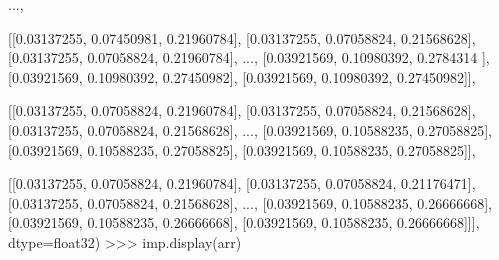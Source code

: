 \documentclass[]{article}
\newenvironment{Shaded}{\begin{snugshade}}{\end{snugshade}}
\newcommand{\FloatTok}[1]{\textcolor[rgb]{0.96,0.45,0.00}{#1}}
\newcommand{\NormalTok}[1]{\textcolor[rgb]{0.81,0.81,0.76}{#1}}
\newcommand{\OperatorTok}[1]{\textcolor[rgb]{0.81,0.81,0.76}{#1}}
\begin{document}
\begin{Shaded}
\begin{Highlighting}[]
\NormalTok{       ...,}

\NormalTok{       [[}\FloatTok{0.03137255}\NormalTok{, }\FloatTok{0.07450981}\NormalTok{, }\FloatTok{0.21960784}\NormalTok{],}
\NormalTok{        [}\FloatTok{0.03137255}\NormalTok{, }\FloatTok{0.07058824}\NormalTok{, }\FloatTok{0.21568628}\NormalTok{],}
\NormalTok{        [}\FloatTok{0.03137255}\NormalTok{, }\FloatTok{0.07058824}\NormalTok{, }\FloatTok{0.21960784}\NormalTok{],}
\NormalTok{        ...,}
\NormalTok{        [}\FloatTok{0.03921569}\NormalTok{, }\FloatTok{0.10980392}\NormalTok{, }\FloatTok{0.2784314}\NormalTok{ ],}
\NormalTok{        [}\FloatTok{0.03921569}\NormalTok{, }\FloatTok{0.10980392}\NormalTok{, }\FloatTok{0.27450982}\NormalTok{],}
\NormalTok{        [}\FloatTok{0.03921569}\NormalTok{, }\FloatTok{0.10980392}\NormalTok{, }\FloatTok{0.27450982}\NormalTok{]],}

\NormalTok{       [[}\FloatTok{0.03137255}\NormalTok{, }\FloatTok{0.07058824}\NormalTok{, }\FloatTok{0.21960784}\NormalTok{],}
\NormalTok{        [}\FloatTok{0.03137255}\NormalTok{, }\FloatTok{0.07058824}\NormalTok{, }\FloatTok{0.21568628}\NormalTok{],}
\NormalTok{        [}\FloatTok{0.03137255}\NormalTok{, }\FloatTok{0.07058824}\NormalTok{, }\FloatTok{0.21568628}\NormalTok{],}
\NormalTok{        ...,}
\NormalTok{        [}\FloatTok{0.03921569}\NormalTok{, }\FloatTok{0.10588235}\NormalTok{, }\FloatTok{0.27058825}\NormalTok{],}
\NormalTok{        [}\FloatTok{0.03921569}\NormalTok{, }\FloatTok{0.10588235}\NormalTok{, }\FloatTok{0.27058825}\NormalTok{],}
\NormalTok{        [}\FloatTok{0.03921569}\NormalTok{, }\FloatTok{0.10588235}\NormalTok{, }\FloatTok{0.27058825}\NormalTok{]],}

\NormalTok{       [[}\FloatTok{0.03137255}\NormalTok{, }\FloatTok{0.07058824}\NormalTok{, }\FloatTok{0.21960784}\NormalTok{],}
\NormalTok{        [}\FloatTok{0.03137255}\NormalTok{, }\FloatTok{0.07058824}\NormalTok{, }\FloatTok{0.21176471}\NormalTok{],}
\NormalTok{        [}\FloatTok{0.03137255}\NormalTok{, }\FloatTok{0.07058824}\NormalTok{, }\FloatTok{0.21568628}\NormalTok{],}
\NormalTok{        ...,}
\NormalTok{        [}\FloatTok{0.03921569}\NormalTok{, }\FloatTok{0.10588235}\NormalTok{, }\FloatTok{0.26666668}\NormalTok{],}
\NormalTok{        [}\FloatTok{0.03921569}\NormalTok{, }\FloatTok{0.10588235}\NormalTok{, }\FloatTok{0.26666668}\NormalTok{],}
\NormalTok{        [}\FloatTok{0.03921569}\NormalTok{, }\FloatTok{0.10588235}\NormalTok{, }\FloatTok{0.26666668}\NormalTok{]]], dtype}\OperatorTok{=}\NormalTok{float32)}
\OperatorTok{>>>}\NormalTok{ imp.display(arr)}
\end{Highlighting}
\end{Shaded}
\end{document}
